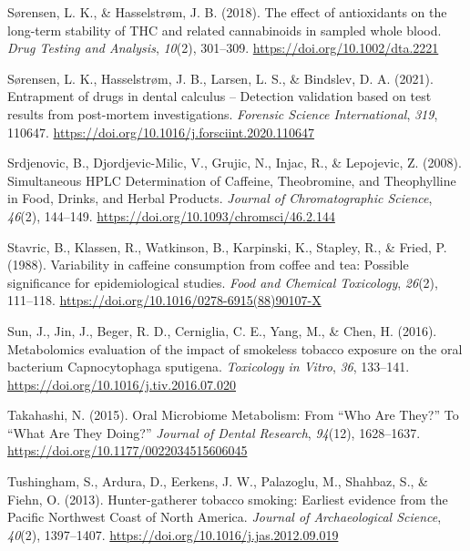 \documentclass[
]{article}
\newlength{\cslhangindent}
\newlength{\cslentryspacingunit} %
\newenvironment{CSLReferences}[2] %
 {%
  \setlength{\parindent}{0pt}
  \ifodd #1
  \let\oldpar\par
  \def\par{\hangindent=\cslhangindent\oldpar}
  \fi
  \setlength{\parskip}{#2\cslentryspacingunit}
 }%
 {}
\begin{document}
\begin{CSLReferences}{1}{0}
\leavevmode{}%
Sørensen, L. K., \& Hasselstrøm, J. B. (2018). The effect of
antioxidants on the long-term stability of {THC} and related
cannabinoids in sampled whole blood. \emph{Drug Testing and Analysis},
\emph{10}(2), 301--309. \url{https://doi.org/10.1002/dta.2221}

\leavevmode{}%
Sørensen, L. K., Hasselstrøm, J. B., Larsen, L. S., \& Bindslev, D. A.
(2021). Entrapment of drugs in dental calculus -- {Detection} validation
based on test results from post-mortem investigations. \emph{Forensic
Science International}, \emph{319}, 110647.
\url{https://doi.org/10.1016/j.forsciint.2020.110647}

\leavevmode{}%
Srdjenovic, B., Djordjevic-Milic, V., Grujic, N., Injac, R., \&
Lepojevic, Z. (2008). Simultaneous {HPLC Determination} of {Caffeine},
{Theobromine}, and {Theophylline} in {Food}, {Drinks}, and {Herbal
Products}. \emph{Journal of Chromatographic Science}, \emph{46}(2),
144--149. \url{https://doi.org/10.1093/chromsci/46.2.144}

\leavevmode{}%
Stavric, B., Klassen, R., Watkinson, B., Karpinski, K., Stapley, R., \&
Fried, P. (1988). Variability in caffeine consumption from coffee and
tea: {Possible} significance for epidemiological studies. \emph{Food and
Chemical Toxicology}, \emph{26}(2), 111--118.
\url{https://doi.org/10.1016/0278-6915(88)90107-X}

\leavevmode{}%
Sun, J., Jin, J., Beger, R. D., Cerniglia, C. E., Yang, M., \& Chen, H.
(2016). Metabolomics evaluation of the impact of smokeless tobacco
exposure on the oral bacterium {Capnocytophaga} sputigena.
\emph{Toxicology in Vitro}, \emph{36}, 133--141.
\url{https://doi.org/10.1016/j.tiv.2016.07.020}

\leavevmode{}%
Takahashi, N. (2015). Oral {Microbiome Metabolism}: {From} {``{Who Are
They}?''} To {``{What Are They Doing}?''} \emph{Journal of Dental
Research}, \emph{94}(12), 1628--1637.
\url{https://doi.org/10.1177/0022034515606045}

\leavevmode{}%
Tushingham, S., Ardura, D., Eerkens, J. W., Palazoglu, M., Shahbaz, S.,
\& Fiehn, O. (2013). Hunter-gatherer tobacco smoking: Earliest evidence
from the {Pacific Northwest Coast} of {North America}. \emph{Journal of
Archaeological Science}, \emph{40}(2), 1397--1407.
\url{https://doi.org/10.1016/j.jas.2012.09.019}


\end{CSLReferences}
\end{document}
